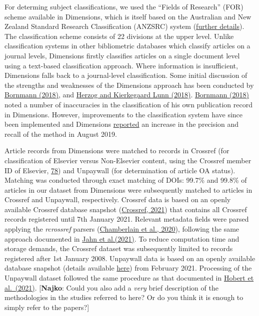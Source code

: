 \documentclass[
]{article}
\begin{document}
For determing subject classifications, we used the ``Fields of Research'' (FOR) scheme available in Dimensions, which is itself based on the Australian and New Zealand Standard Research Classification (ANZSRC) system (\href{https://dimensions.freshdesk.com/support/solutions/articles/23000018826-what-is-the-background-behind-the-fields-of-research-for-classification-system-}{further details}). The classification scheme consists of 22 divisions at the upper level. Unlike classification systems in other bibliometric databases which classify articles on a journal levels, Dimensions firstly classifies articles on a single document level using a text-based classification approach. Where information is insufficient, Dimensions falls back to a journal-level classification. Some initial discussion of the strengths and weaknesses of the Dimensions approach has been conducted by \href{https://doi.org/10.1007/s11192-018-2855-y}{Bornmann (2018)}, and \href{https://doi.org/10.1007/s11192-018-2854-z}{Herzog and Kierkegaard Lunn (2018)}. \href{https://doi.org/10.1007/s11192-018-2855-y}{Bornmann (2018)} noted a number of inaccuracies in the classification of his own publication record in Dimensions. However, improvements to the classification system have since been implemented and Dimensions \href{https://www.dimensions.ai/release-notes/}{reported} an increase in the precision and recall of the method in August 2019.

Article records from Dimensions were matched to records in Crossref (for classification of Elsevier versus Non-Elsevier content, using the Crossref member ID of Elsevier, \href{https://www.crossref.org/members/prep/78}{78}) and Unpaywall (for determination of article OA status). Matching was conducted through exact matching of DOIs: 99.7\% and 99.8\% of articles in our dataset from Dimensions were subsequently matched to articles in Crossref and Unpaywall, respectively. Crossref data is based on an openly available Crossref database snapshot (\href{https://academictorrents.com/details/e4287cb7619999709f6e9db5c359dda17e93d515}{Crossref, 2021}) that contains all Crossref records registered until 7th January 2021. Relevant metadata fields were parsed applying the \emph{rcrossref} parsers (\href{https://CRAN.R-project.org/package=rcrossref}{Chamberlain et al., 2020}), following the same approach documented in \href{https://arxiv.org/abs/2102.04789}{Jahn et al.(2021)}. To reduce computation time and storage demands, the Crossref dataset was subsequently limited to records registered after 1st January 2008. Unpaywall data is based on an openly available database snapshot (details available \href{https://unpaywall.org/products/snapshot}{here}) from February 2021. Processing of the Unpaywall dataset followed the same procedure as that documented in \href{https://edoc.hu-berlin.de/handle/18452/23336}{Hobert et al.~(2021)}. {[}\textbf{Najko}: Could you also add a \emph{very} brief description of the methodologies in the studies referred to here? Or do you think it is enough to simply refer to the papers?{]}
\end{document}
